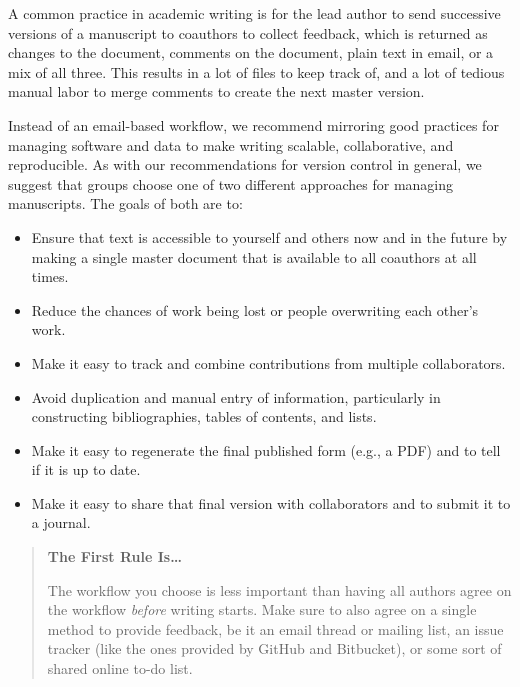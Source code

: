 \documentclass[10pt]{article}
\begin{document}
A common practice in academic writing is for the lead author to send
successive versions of a manuscript to coauthors to collect feedback,
which is returned as changes to the document, comments on the
document, plain text in email, or a mix of all three. This results in
a lot of files to keep track of, and a lot of tedious manual labor to
merge comments to create the next master version.

Instead of an email-based workflow, we recommend mirroring good
practices for managing software and data to make writing scalable,
collaborative, and reproducible.  As with our recommendations for
version control in general, we suggest that groups choose one of two
different approaches for managing manuscripts.  The goals of both are
to:

\begin{itemize}

\item
  Ensure that text is accessible to yourself and others now and in the
  future by making a single master document that is available to all
  coauthors at all times.

\item
  Reduce the chances of work being lost or people overwriting each
  other's work.

\item
  Make it easy to track and combine contributions from multiple
  collaborators.

\item
  Avoid duplication and manual entry of information, particularly in
  constructing bibliographies, tables of contents, and lists.

\item
  Make it easy to regenerate the final published form (e.g., a PDF)
  and to tell if it is up to date.

\item
  Make it easy to share that final version with collaborators and to
  submit it to a journal.

\end{itemize}

\begin{quote}
  \noindent \textbf{The First Rule Is{\ldots}}

  The workflow you choose is less important than having all authors
  agree on the workflow \emph{before} writing starts. Make sure to
  also agree on a single method to provide feedback, be it an email
  thread or mailing list, an issue tracker (like the ones provided by
  GitHub and Bitbucket), or some sort of shared online to-do list.
\end{quote}
\end{document}
